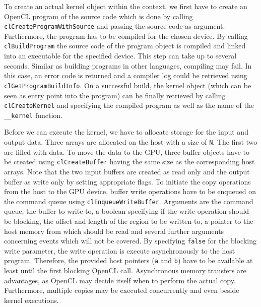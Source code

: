 To create an actual kernel object within the context, we first have to create an OpenCL program of the source code which is done by calling \lstinline!clCreateProgramWithSource! and passing the source code as argument. Furthermore, the program has to be compiled for the chosen device. By calling \lstinline!clBuildProgram! the source code of the program object is compiled and linked into an executable for the specified device. This step can take up to several seconds. Similar as building programs in other languages, compiling may fail. In this case, an error code is returned and a compiler log could be retrieved using \lstinline!clGetProgramBuildInfo!.
On a successful build, the kernel object (which can be seen as entry point into the program) can be finally retrieved by calling \lstinline!clCreateKernel! and specifying the compiled program as well as the name of the \lstinline!__kernel! function.

Before we can execute the kernel, we have to allocate storage for the input and output data. Three arrays are allocated on the host with a size of \lstinline!N!. The first two are filled with data. To move the data to the GPU, three buffer objects have to be created using \lstinline!clCreateBuffer! having the same size as the corresponding host arrays. Note that the two input buffers are created as read only and the output buffer as write only by setting appropriate flags. To initiate the copy operations from the host to the GPU device, buffer write operations have to be enqueued on the command queue using \lstinline!clEnqueueWriteBuffer!. Arguments are the command queue, the buffer to write to, a boolean specifying if the write operation should be blocking, the offset and length of the region to be written to, a pointer to the host memory from which should be read and several further arguments concerning events which will not be covered. By specifying \lstinline!false! for the blocking write parameter, the write operation is execute asynchronously to the host program. Therefore, the provided host pointers (\lstinline!a! and \lstinline!b!) have to be available at least until the first blocking OpenCL call. Asynchronous memory transfers are advantages, as OpenCL may decide itself when to perform the actual copy. Furthermore, multiple copies may be executed concurrently and even beside kernel executions.


